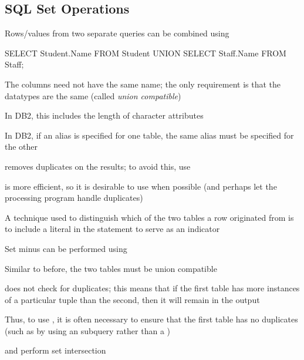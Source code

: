 \documentclass[a4paper]{article}
\begin{document}
\subsection{SQL Set Operations}
\begin{itemize}
    \item Rows/values from two separate queries can be combined using 
\begin{sql}
SELECT Student.Name FROM Student
UNION
SELECT Staff.Name FROM Staff;
\end{sql}
 	\item {} removes duplicates on the results; to avoid this, use 
 	\item {} is more efficient, so it is desirable to use  when possible (and perhaps let the processing program handle duplicates)
 	\item A technique used to distinguish which of the two tables a row originated from is to include a literal in the  statement to serve as an indicator
	\end{arrows}
	\item Set minus can be performed using \ilsql{EXCEPT}
	\begin{arrows}
	\item Similar to before, the two tables must be union compatible
	\item {} does not check for duplicates; this means that if the first table has more instances of a particular tuple than the second, then it will remain in the output
	\item Thus, to use , it is often necessary to ensure that the first table has no duplicates (such as by using an  subquery rather than a \ilsql{JOIN})
	\end{arrows}
	\item {} and  perform set intersection
  \end{itemize}
\end{document}
